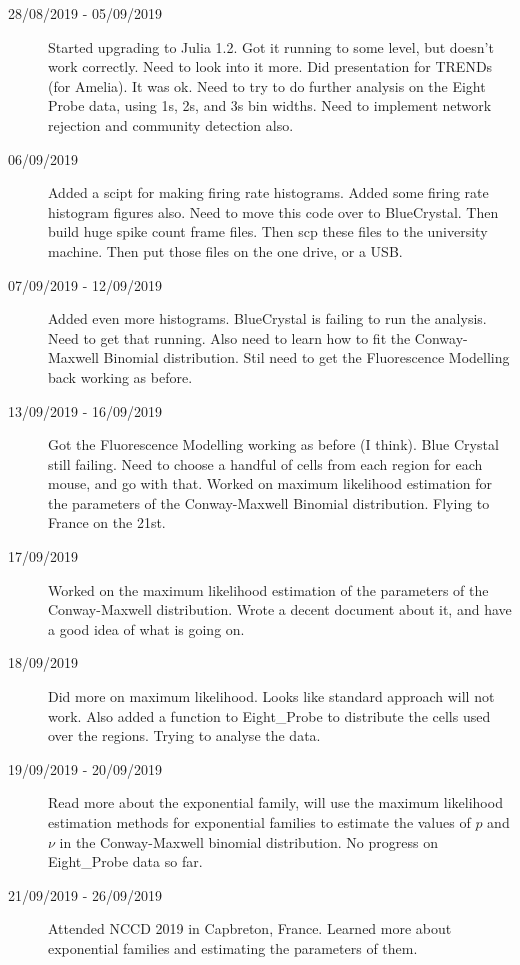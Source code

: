 \documentclass[a4paper,12pt]{article}
\theoremstyle{definition}
\begin{document}
\begin{description}
	\item[28/08/2019 - 05/09/2019] Started upgrading to Julia 1.2. Got it running to some level, but doesn't work correctly. Need to look into it more. Did presentation for TRENDs (for Amelia). It was ok. Need to try to do further analysis on the Eight Probe data, using 1s, 2s, and 3s bin widths. Need to implement network rejection and community detection also.

	\item[06/09/2019] Added a scipt for making firing rate histograms. Added some firing rate histogram figures also. Need to move this code over to BlueCrystal. Then build huge spike count frame files. Then scp these files to the university machine. Then put those files on the one drive, or a USB.

	\item[07/09/2019 - 12/09/2019] Added even more histograms. BlueCrystal is failing to run the analysis. Need to get that running. Also need to learn how to fit the Conway-Maxwell Binomial distribution. Stil need to get the Fluorescence Modelling back working as before.

	\item[13/09/2019 - 16/09/2019] Got the Fluorescence Modelling working as before (I think). Blue Crystal still failing. Need to choose a handful of cells from each region for each mouse, and go with that. Worked on maximum likelihood estimation for the parameters of the Conway-Maxwell Binomial distribution. Flying to France on the 21st.

	\item[17/09/2019] Worked on the maximum likelihood estimation of the parameters of the \\ Conway-Maxwell distribution. Wrote a decent document about it, and have a good idea of what is going on.

	\item[18/09/2019] Did more on maximum likelihood. Looks like standard approach will not work. Also added a function to Eight\_Probe to distribute the cells used over the regions. Trying to analyse the data.

	\item[19/09/2019 - 20/09/2019] Read more about the exponential family, will use the maximum likelihood estimation methods for exponential families to estimate the values of $p$ and $\nu$ in the Conway-Maxwell binomial distribution. No progress on Eight\_Probe data so far.

	\item[21/09/2019 - 26/09/2019] Attended NCCD 2019 in Capbreton, France. Learned more about exponential families and estimating the parameters of them.


\end{description}
\end{document}
